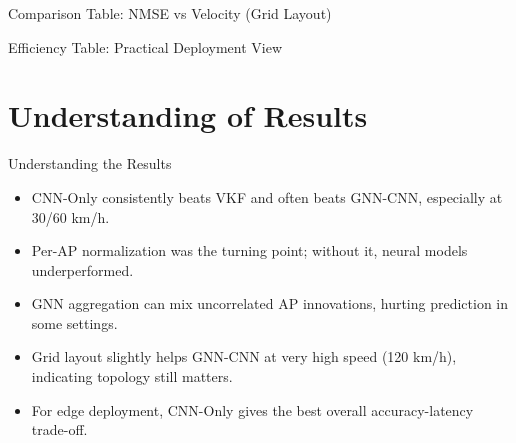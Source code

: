 \documentclass{beamer}
\begin{document}
\begin{frame}{Comparison Table: NMSE vs Velocity (Grid Layout)}
    \scriptsize
    \centering
\end{frame}

\begin{frame}{Efficiency Table: Practical Deployment View}
    \scriptsize
    \centering
\end{frame}

\section[Result Insights]{Understanding of Results}

\begin{frame}{Understanding the Results}
    \small
    \begin{itemize}
        \item CNN-Only consistently beats VKF and often beats GNN-CNN, especially at 30/60 km/h.
        \item Per-AP normalization was the turning point; without it, neural models underperformed.
        \item GNN aggregation can mix uncorrelated AP innovations, hurting prediction in some settings.
        \item Grid layout slightly helps GNN-CNN at very high speed (120 km/h), indicating topology still matters.
        \item For edge deployment, CNN-Only gives the best overall accuracy-latency trade-off.
    \end{itemize}
\end{frame}
\end{document}
